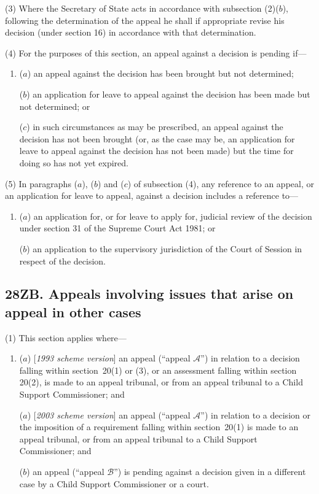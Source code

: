 \documentclass[12pt,a4paper]{article}
\begin{document}
(3) Where the Secretary of State acts in accordance with subsection (2)($b$), following the determination of the appeal he shall if appropriate revise his decision (under section 16) in accordance with that determination.

(4) For the purposes of this section, an appeal against a decision is pending if—
\begin{enumerate}\item[]
($a$) an appeal against the decision has been brought but not determined;

($b$) an application for leave to appeal against the decision has been made but not determined; or

($c$) in such circumstances as may be prescribed, an appeal against the decision has not been brought (or, as the case may be, an application for leave to appeal against the decision has not been made) but the time for doing so has not yet expired.
\end{enumerate}

(5) In paragraphs ($a$), ($b$) and ($c$) of subsection (4), any reference to an appeal, or an application for leave to appeal, against a decision includes a reference to—
\begin{enumerate}\item[]
($a$) an application for, or for leave to apply for, judicial review of the decision under section 31 of the Supreme Court Act 1981; or

($b$) an application to the supervisory jurisdiction of the Court of Session in respect of the decision.
\end{enumerate}


\subsection{28ZB. Appeals involving issues that arise on appeal in other cases}

(1) This section applies where—
\begin{enumerate}\item[]
($a$) [\emph{1993 scheme version}] an appeal (“appeal $\mathcal{A}$”) in relation to a decision falling within section~20(1) or (3), or an assessment falling within section 20(2), is made to an appeal tribunal, or from an appeal tribunal to a Child Support Commissioner; and

($a$) [\emph{2003 scheme version}] an appeal (“appeal $\mathcal{A}$”) in relation to a decision or the imposition of a requirement falling within section~20(1)  is made to an appeal tribunal, or from an appeal tribunal to a Child Support Commissioner;
and

($b$) an appeal (“appeal $\mathcal{B}$”) is pending against a decision given in a different case by a Child Support Commissioner or a court.
\end{enumerate}
\end{document}
